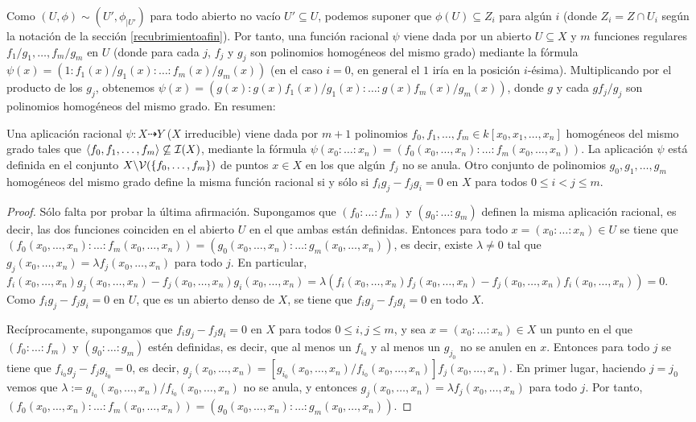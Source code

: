 \documentclass[ACGA.tex]{subfiles}
\begin{document}
Como $(U,\phi)\sim (U',\phi_{|U'})$ para todo abierto no vacío $U'\subseteq U$, podemos suponer que $\phi(U)\subseteq Z_i$ para algún $i$ (donde $Z_i=Z\cap U_i$ según la notación de la sección \ref{recubrimientoafin}). Por tanto, una función racional $\psi$ viene dada por un abierto $U\subseteq X$ y $m$ funciones regulares $f_1/g_1,\ldots,f_m/g_m$ en $U$ (donde para cada $j$, $f_j$ y $g_j$ son polinomios homogéneos del mismo grado) mediante la fórmula $\psi(x)=(1:f_1(x)/g_1(x):\ldots:f_m(x)/g_m(x))$ (en el caso $i=0$, en general el $1$ iría en la posición $i$-ésima). Multiplicando por el producto de los $g_j$, obtenemos $\psi(x)=(g(x):g(x)f_1(x)/g_1(x):\ldots:g(x)f_m(x)/g_m(x))$, donde $g$ y cada $gf_j/g_j$ son polinomios homogéneos del mismo grado. En resumen:

\begin{prop}
 Una aplicación racional $\psi:X\dashrightarrow Y$ ($X$ irreducible) viene dada por $m+1$ polinomios $f_0,f_1,\ldots,f_m\in k[x_0,x_1,\ldots,x_n]$ homogéneos del mismo grado tales que $\langle f_0,f_1,\ldots,f_m\rangle\not\subseteq\mathcal{I}(X)$, mediante la fórmula $\psi(x_0:\ldots:x_n)=(f_0(x_0,\ldots,x_n):\ldots:f_m(x_0,\ldots,x_n))$. La aplicación $\psi$ está definida en el conjunto $X\backslash\mathcal{V}(\{f_0,\ldots,f_m\})$ de puntos $x\in X$ en los que algún $f_j$ no se anula. Otro conjunto de polinomios $g_0,g_1,\ldots,g_m$ homogéneos del mismo grado define la misma función racional si y sólo si $f_ig_j-f_jg_i=0$ en $X$ para todos $0\leq i<j\leq m$. 
\end{prop}

\begin{proof}
 Sólo falta por probar la última afirmación. Supongamos que $(f_0:\ldots:f_m)$ y $(g_0:\ldots:g_m)$ definen la misma aplicación racional, es decir, las dos funciones coinciden en el abierto $U$ en el que ambas están definidas. Entonces para todo $x=(x_0:\ldots:x_n)\in U$ se tiene que $(f_0(x_0,\ldots,x_n):\ldots:f_m(x_0,\ldots,x_n))=(g_0(x_0,\ldots,x_n):\ldots:g_m(x_0,\ldots,x_n))$, es decir, existe $\lambda\neq 0$ tal que $g_j(x_0,\ldots,x_n)=\lambda f_j(x_0,\ldots,x_n)$ para todo $j$. En particular, $f_i(x_0,\ldots,x_n)g_j(x_0,\ldots,x_n)-f_j(x_0,\ldots,x_n)g_i(x_0,\ldots,x_n)=\lambda(f_i(x_0,\ldots,x_n)f_j(x_0,\ldots,x_n)-f_j(x_0,\ldots,x_n)f_i(x_0,\ldots,x_n))=0$. Como $f_ig_j-f_jg_i=0$ en $U$, que es un abierto denso de $X$, se tiene que $f_ig_j-f_jg_i=0$ en todo $X$.
 
Recíprocamente, supongamos que $f_ig_j-f_jg_i=0$ en $X$ para todos $0\leq i,j\leq m$, y sea $x=(x_0:\ldots:x_n)\in X$ un punto en el que $(f_0:\ldots:f_m)$ y $(g_0:\ldots:g_m)$ estén definidas, es decir, que al menos un $f_{i_0}$ y al menos un $g_{j_0}$ no se anulen en $x$. Entonces para todo $j$ se tiene que $f_{i_0}g_j-f_jg_{i_0}=0$, es decir, $g_j(x_0,\ldots,x_n)=[g_{i_0}(x_0,\ldots,x_n)/f_{i_0}(x_0,\ldots,x_n)]f_j(x_0,\ldots,x_n)$. En primer lugar, haciendo $j=j_0$ vemos que $\lambda:=g_{i_0}(x_0,\ldots,x_n)/f_{i_0}(x_0,\ldots,x_n)$ no se anula, y entonces $g_j(x_0,\ldots,x_n)=\lambda f_j(x_0,\ldots,x_n)$ para todo $j$. Por tanto, $(f_0(x_0,\ldots,x_n):\ldots:f_m(x_0,\ldots,x_n))=(g_0(x_0,\ldots,x_n):\ldots:g_m(x_0,\ldots,x_n))$.
\end{proof}
\end{document}

